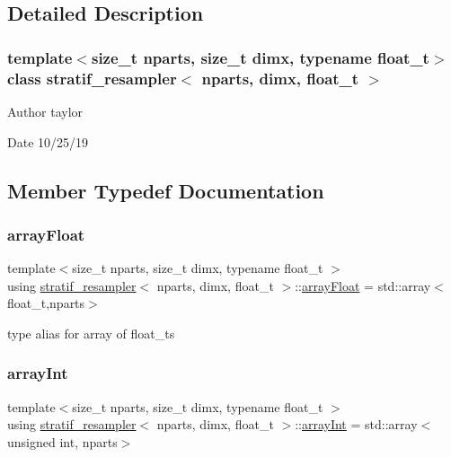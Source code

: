 \subsection{Detailed Description}
\subsubsection*{template$<$size\+\_\+t nparts, size\+\_\+t dimx, typename float\+\_\+t$>$\newline
class stratif\+\_\+resampler$<$ nparts, dimx, float\+\_\+t $>$}

\begin{DoxyAuthor}{Author}
taylor 
\end{DoxyAuthor}
\begin{DoxyDate}{Date}
10/25/19 
\end{DoxyDate}


\subsection{Member Typedef Documentation}
\mbox{\label{classstratif__resampler_ad85a57b7463ac619bb3123a2cd20bb01}} 
\subsubsection{\texorpdfstring{array\+Float}{arrayFloat}}
{\footnotesize\ttfamily template$<$size\+\_\+t nparts, size\+\_\+t dimx, typename float\+\_\+t $>$ \\
using \hyperlink{classstratif__resampler}{stratif\+\_\+resampler}$<$ nparts, dimx, float\+\_\+t $>$\+::\hyperlink{classrbase_a6f76bef853e508cb5b6f546d231b06f5}{array\+Float} =  std\+::array$<$float\+\_\+t,nparts$>$}

type alias for array of float\+\_\+ts \mbox{\label{classstratif__resampler_a6feed5616bbd45f1bcf155fdf6348e19}} 
\subsubsection{\texorpdfstring{array\+Int}{arrayInt}}
{\footnotesize\ttfamily template$<$size\+\_\+t nparts, size\+\_\+t dimx, typename float\+\_\+t $>$ \\
using \hyperlink{classstratif__resampler}{stratif\+\_\+resampler}$<$ nparts, dimx, float\+\_\+t $>$\+::\hyperlink{classstratif__resampler_a6feed5616bbd45f1bcf155fdf6348e19}{array\+Int} =  std\+::array$<$unsigned int, nparts$>$}

